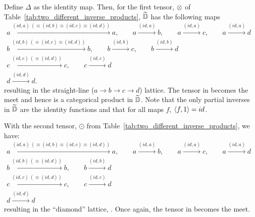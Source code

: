 Define $\Delta$ as the identity map. Then, for the first tensor, $\otimes$ of
Table~\ref{tab:two_different_inverse_products}, $\widetilde{\mathbb{D}}$ has the following
maps
\begin{align*}
  a \xrightarrow{(id,a)\ (\equiv (id, b) \equiv (id,c) \equiv (id,d))} a, \qquad a
    \xrightarrow{(id,a)} b, \qquad a \xrightarrow{(id, a)} c , \qquad a \xrightarrow{(id, a)} d \\
  b \xrightarrow{(id,b) \ (\equiv (id, c) \equiv (id, d))} b , \qquad b \xrightarrow{(id,b)} c,
    \qquad b \xrightarrow{(id,b)} d\\
  c \xrightarrow{(id, c) \ (\equiv (id, d))} c ,   \qquad c \xrightarrow{(id,c)} d\\
  d \xrightarrow{(id,d)} d.
\end{align*}
resulting in the straight-line ($a \to b \to c \to d$) lattice. The tensor in \D becomes the meet
and hence is a categorical product in $\widetilde{\mathbb{D}}$. Note that the only partial inverses in
$\widetilde{\mathbb{D}}$ are the identity functions and that for all maps $f$, $\langle f,1\rangle = id$.

With the second tensor, $\odot$ from Table~\ref{tab:two_different_inverse_products}, we have:
\begin{align*}
  a \xrightarrow{(id,a) \ (\equiv (id, b) \equiv (id,c) \equiv (id,d))} a, \qquad
    a \xrightarrow{(id,a)} b, \qquad a \xrightarrow{(id, a)} c , \qquad a \xrightarrow{(id, a)} d \\
  b \xrightarrow{(id,b) \ (\equiv (id, d))} b ,  \qquad b \xrightarrow{(id,b)} d\\
  c \xrightarrow{(id, c) \ (\equiv (id, d))} c,   \qquad c \xrightarrow{(id,c)} d\\
  d \xrightarrow{(id,d)} d
\end{align*}
resulting in the ``diamond'' lattice, . Once again, the tensor in \D becomes the meet.

